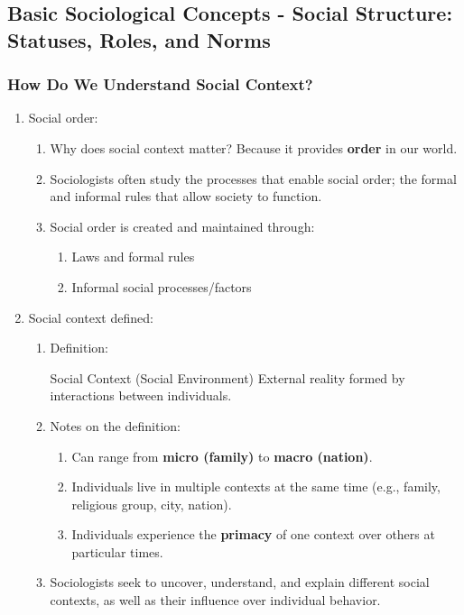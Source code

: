 \documentclass[12pt,a4paper]{article}
\begin{document}
\subsection{Basic Sociological Concepts - Social Structure: Statuses, Roles, and Norms}
\subsubsection{How Do We Understand Social Context?}
\begin{enumerate}
	\item Social order: 
	\begin{enumerate}
		\item Why does social context matter? Because it provides \textbf{order} in our world. 
		\item Sociologists often study the processes that enable social order; the formal and informal rules that allow society to function.
		\item Social order is created and maintained through: 
		\begin{enumerate}
			\item Laws and formal rules
			\item Informal social processes/factors
		\end{enumerate}
	\end{enumerate}
	\item Social context defined: 
	\begin{enumerate}
		\item Definition: 
		\begin{df}{Social Context (Social Environment)}
			External reality formed by interactions between individuals.
		\end{df}
		\item Notes on the definition: 
		\begin{enumerate}
			\item Can range from \textbf{micro (family)} to \textbf{macro (nation)}. 
			\item Individuals live in multiple contexts at the same time (e.g., family, religious group, city, nation). 
			\item Individuals experience the \textbf{primacy} of one context over others at particular times. 
		\end{enumerate}
		\item Sociologists seek to uncover, understand, and explain different social contexts, as well as their influence over individual behavior. 
	\end{enumerate}

\end{enumerate}
\end{document}

